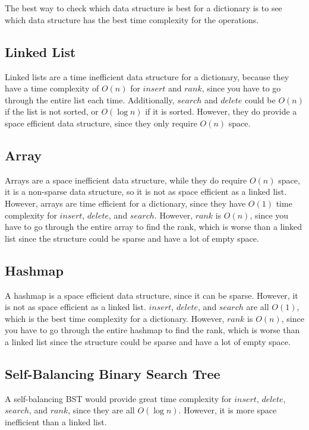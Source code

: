 \section{}
The best way to check which data structure is best for a dictionary is to see which data structure has the best time complexity for the operations.

\subsection*{Linked List}
Linked lists are a time inefficient data structure for a dictionary, because they have a time complexity of $O(n)$ for $insert$ and $rank$, since you have to go through the entire list each time. Additionally, $search$ and $delete$ could be $O(n)$ if the list is not sorted, or $O(\log n)$ if it is sorted. However, they do provide a space efficient data structure, since they only require $O(n)$ space.

\subsection*{Array}
Arrays are a space inefficient data structure, while they do require $O(n)$ space, it is a non-sparse data structure, so it is not as space efficient as a linked list. However, arrays are time efficient for a dictionary, since they have $O(1)$ time complexity for $insert$, $delete$, and $search$. However, $rank$ is $O(n)$, since you have to go through the entire array to find the rank, which is worse than a linked list since the structure could be sparse and have a lot of empty space. 

\subsection*{Hashmap}
A hashmap is a space efficient data structure, since it can be sparse. However, it is not as space efficient as a linked list. $insert$, $delete$, and $search$ are all $O(1)$, which is the best time complexity for a dictionary. However, $rank$ is $O(n)$, since you have to go through the entire hashmap to find the rank, which is worse than a linked list since the structure could be sparse and have a lot of empty space.

\subsection*{Self-Balancing Binary Search Tree}
A self-balancing BST would provide great time complexity for $insert$, $delete$, $search$, and $rank$, since they are all $O(\log n)$. However, it is more space inefficient than a linked list.